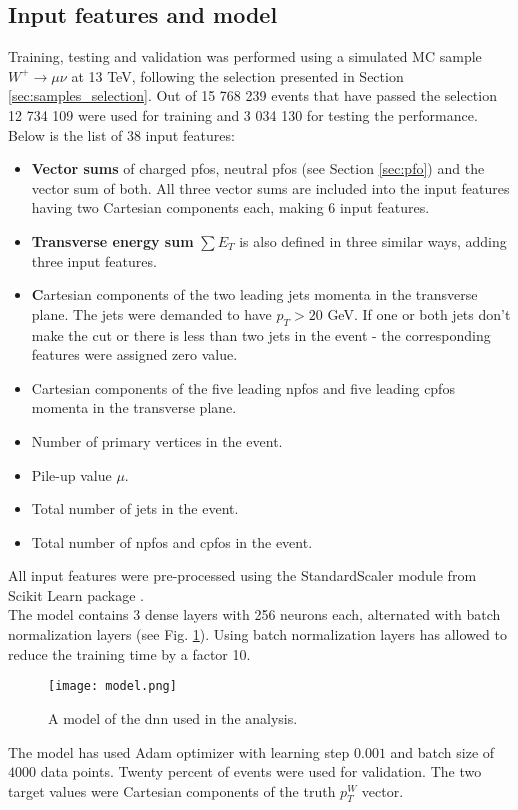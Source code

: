 \subsection{Input features and model}
 Training, testing and validation was performed using a simulated MC sample $W^+\rightarrow\mu\nu$ at 13 TeV, following the selection presented in Section \ref{sec:samples_selection}. Out of 15 768 239 events that have passed the selection 12 734 109 were used for training and 3 034 130 for testing the performance. 
 Below is the list of 38 input features: 
 \begin{itemize}
 \item \textbf{Vector sums} of charged \gls{pfos}, neutral \gls{pfos} (see Section \ref{sec:pfo}) and the vector sum of both. All three vector sums are included into the input features having two Cartesian components each, making 6 input features. 
 \item \textbf{Transverse energy sum} $\sum E_T$ is also defined in three similar ways, adding three input features.
 \item \textbf Cartesian components of the {two leading jets} momenta in the transverse plane. The jets were demanded to have $p_T>20$ GeV. If one or both jets don't make the cut or there is less than two jets in the event - the corresponding features were assigned zero value. 
 \item Cartesian components of the {five leading \gls{npfos} and five leading \gls{cpfos}} momenta in the transverse plane. 
 \item Number of primary vertices in the event.
 \item Pile-up value $\mu$.
 \item Total number of jets in the event.
 \item Total number of \gls{npfos} and \gls{cpfos} in the event.
\end{itemize}
All input features were pre-processed using the StandardScaler module from Scikit Learn package \cite{scikit-learn}.\\
The model contains 3 dense layers with 256 neurons each, alternated with batch normalization layers (see Fig. \ref{fig::nnmodel}). Using batch normalization layers has allowed to reduce the training time by a factor 10. 
\begin{figure}[htpb]
	\centering
	\texttt{[image: model.png]}
	\caption{A model of the \gls{dnn} used in the analysis. }
	\label{fig::nnmodel}
\end{figure}
The model has used Adam optimizer with learning step $0.001$ and batch size of $4000$ data points. Twenty percent of events were used for validation. The two target values were Cartesian components of the truth $p_T^W$ vector. 


